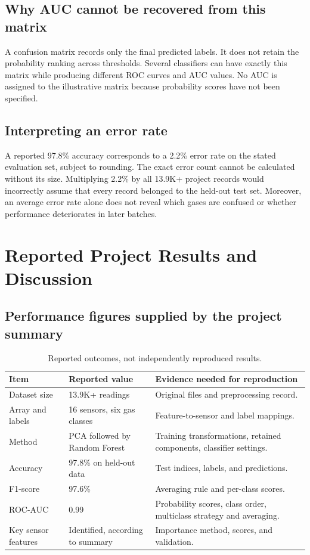\documentclass[11pt,a4paper]{article}
\newcommand{\sectionpage}[1]{\clearpage\section{#1}}
\begin{document}
\subsection{Why AUC cannot be recovered from this matrix}
A confusion matrix records only the final predicted labels. It does not retain the probability ranking across thresholds. Several classifiers can have exactly this matrix while producing different ROC curves and AUC values. No AUC is assigned to the illustrative matrix because probability scores have not been specified.

\subsection{Interpreting an error rate}
A reported 97.8\% accuracy corresponds to a 2.2\% error rate on the stated evaluation set, subject to rounding. The exact error count cannot be calculated without its size. Multiplying 2.2\% by all 13.9K+ project records would incorrectly assume that every record belonged to the held-out test set. Moreover, an average error rate alone does not reveal which gases are confused or whether performance deteriorates in later batches.

\sectionpage{Reported Project Results and Discussion}
\subsection{Performance figures supplied by the project summary}
\begin{table}[h!]\centering\small
\begin{tabularx}{\textwidth}{@{}lXX@{}}\toprule
Item & Reported value & Evidence needed for reproduction\\\midrule
Dataset size & 13.9K+ readings & Original files and preprocessing record.\\
Array and labels & 16 sensors, six gas classes & Feature-to-sensor and label mappings.\\
Method & PCA followed by Random Forest & Training transformations, retained components, classifier settings.\\
Accuracy & 97.8\% on held-out data & Test indices, labels, and predictions.\\
F1-score & 97.6\% & Averaging rule and per-class scores.\\
ROC-AUC & 0.99 & Probability scores, class order, multiclass strategy and averaging.\\
Key sensor features & Identified, according to summary & Importance method, scores, and validation.\\\bottomrule
\end{tabularx}
\caption{Reported outcomes, not independently reproduced results.}
\end{table}
\end{document}
